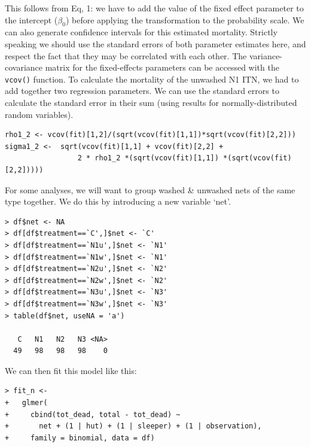 \documentclass[11pt]{article}
\begin{document}
This follows from Eq, 1: we have to add the value of the fixed effect parameter to the intercept ($\beta_0$) before applying the transformation to the probability scale. We can also generate confidence intervals for this estimated mortality. Strictly speaking we should use the standard errors of both parameter estimates here, and respect the fact that they may be correlated with each other. The variance-covariance matrix for the fixed-effects parameters can be accessed with the \verb+vcov()+ function. To calculate the mortality of the unwashed N1 ITN, we had to add together two regression parameters. We can use the standard errors to calculate the standard error in their sum (using results for normally-distributed random variables).
\begin{verbatim}
rho1_2 <- vcov(fit)[1,2]/(sqrt(vcov(fit)[1,1])*sqrt(vcov(fit)[2,2]))
sigma1_2 <-  sqrt(vcov(fit)[1,1] + vcov(fit)[2,2] + 
                 2 * rho1_2 *(sqrt(vcov(fit)[1,1]) *(sqrt(vcov(fit)[2,2]))))
\end{verbatim}


For some analyses, we will want to group washed \& unwashed nets of the same type together. We do this by introducing a new variable `net'.
\begin{verbatim}
> df$net <- NA
> df[df$treatment==`C',]$net <- `C'
> df[df$treatment==`N1u',]$net <- `N1'
> df[df$treatment==`N1w',]$net <- `N1'
> df[df$treatment==`N2u',]$net <- `N2'
> df[df$treatment==`N2w',]$net <- `N2'
> df[df$treatment==`N3u',]$net <- `N3'
> df[df$treatment==`N3w',]$net <- `N3'
> table(df$net, useNA = 'a')

   C   N1   N2   N3 <NA> 
  49   98   98   98    0 
\end{verbatim}

We can then fit this model like this:
\begin{verbatim}
> fit_n <-
+   glmer(
+     cbind(tot_dead, total - tot_dead) ~
+       net + (1 | hut) + (1 | sleeper) + (1 | observation),
+     family = binomial, data = df) 
\end{verbatim}
\end{document}
